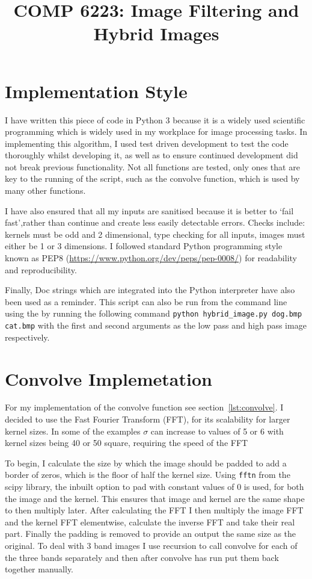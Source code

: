 \documentclass[a4paper,10pt]{article}
\title{COMP 6223: Image Filtering and Hybrid Images}
\date{}
\author{}
\begin{document}
\maketitle
\thispagestyle{fancy}

\section{Implementation Style}
I have written this piece of code in Python 3 because it is a widely used
scientific programming which is widely used in my workplace for image processing
tasks. In implementing this algorithm, I used test driven development to test the code
thoroughly whilst developing it, as well as to ensure continued development did
not break previous functionality. Not all functions are tested, only ones that
are key to the running of the script, such as the convolve function, which is
used by many other functions.

I have also ensured that all my inputs are sanitised because it is better to
`fail fast',rather than continue and create less easily detectable errors.
Checks include: kernels must be odd and 2 dimensional, type checking for all
inputs, images must either be 1 or 3 dimensions. I followed standard Python
programming style known as PEP8 (\url{https://www.python.org/dev/peps/pep-0008/})
for readability and reproducibility.

Finally, Doc strings which are
integrated into the Python interpreter have also been used as a reminder. This
script can also be run from the command line using the by running the following
command \lstinline|python hybrid_image.py dog.bmp cat.bmp| with the
first and second arguments as the low pass  and high pass image respectively.

\section{Convolve Implemetation}
For my implementation of the convolve function see section~\ref{lst:convolve}. I
decided to use the Fast Fourier Transform (FFT), for its scalability
for larger kernel sizes. In some of the examples $\sigma$ can increase to values
of 5 or 6 with kernel sizes being 40 or 50 square, requiring the speed of the
FFT

To begin, I calculate the size by which the image should be padded to add a
border of zeros, which is the floor of half the kernel size. Using
\lstinline|fftn| from the scipy library, the inbuilt option to pad with constant
values of 0 is used, for both the image and the kernel. This ensures that
image and kernel are the same shape to then multiply later. After
calculating the FFT I then multiply the image FFT and the kernel FFT
elementwise, calculate the inverse FFT and take their real part. Finally the
padding is removed to provide an output the same size as the original. To deal with 3 band
images I use recursion to call convolve for each of the three bands separately
and then after convolve has run put them back together manually.
\end{document}

